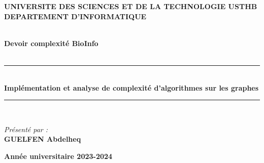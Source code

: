 \documentclass[a4paper,12pt]{report}
\begin{document}
\begin{titlepage}

\begin{center}
\begin{minipage}{10cm}
	\begin{center}
	\textbf{UNIVERSITE DES SCIENCES ET DE LA TECHNOLOGIE USTHB}\\[0.1cm]
    \textbf{DEPARTEMENT D'INFORMATIQUE}
	\end{center}
\end{minipage}\hfill


\textsc{\Large }\\[2.5cm]
{\large \bfseries Devoir complexité BioInfo}\\[1cm]

\textsc{\Large }\\[1cm]
\rule{\linewidth}{0.3mm} \\[0.4cm]
{ \huge \bfseries\color{blue} Implémentation et analyse de complexité d’algorithmes sur les graphes\\[0.4cm] }
\rule{\linewidth}{0.3mm} \\[3cm]


\noindent
\begin{minipage}{0.4\textwidth}
  \begin{flushleft} \large
    \emph{Présenté par :}\\
    \textbf{GUELFEN Abdelheq}\\
  \end{flushleft}
\end{minipage}

\vfill
{\textbf{\large {Année universitaire} 2023-2024}}
\end{center}
\end{titlepage}
\end{document}

